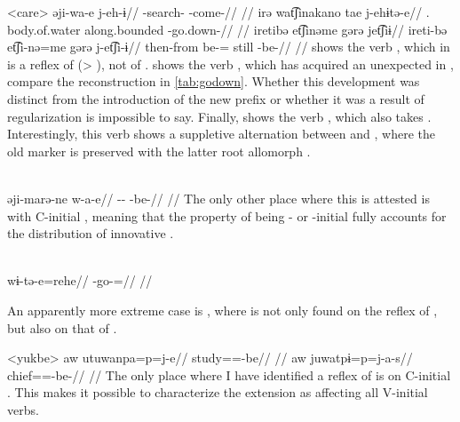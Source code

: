 \pex<care>\carijo
{}
\begingl
\gla əji-wa-e j-eh-ɨ//
\glb {}-search- -come-//
\glft {} \parencite[][102]{guerrero2019carijo}//
\endgl
{}
\begingl
\gla irə wat͡ʃinakano tae j-ehɨtə-e//
\glb {}. body.of.water along.bounded -go.down-//
\glft {} //
\endgl
{}
\begingl
\glpreamble iretibə et͡ʃinəme gərə jet͡ʃiɨ//
\gla ireti-bə et͡ʃi-nə=me gərə j-et͡ʃi-ɨ//
\glb then-from be-= still -be-//
\glft {} \parencite[][177]{robayo1989rame}//
\endgl
\xe
%
 shows the verb , which in \carijo is a reflex of  (> ), not of .
 shows the verb , which has acquired an unexpected  in \carijo, compare the reconstruction in \cref{tab:godown}.
Whether this development was distinct from the introduction of the new prefix  or whether it was a result of regularization is impossible to say.
Finally,  shows the verb  , which also takes .
Interestingly, this verb shows a suppletive alternation between  and , where the old marker  is preserved with the latter root allomorph .

\carijo \parencite[][42]{guerrero2016karihona}\\
\begingl
\gla əji-marə-ne w-a-e//
\glb {}-- -be-//
\glft {}//
\endgl
\xe
%
The only other place where this  is attested is with C-initial   , meaning that the property of being - or -initial fully accounts for the distribution of innovative .

\carijo \parencite[][5]{guerrero2016karihona}\\
\begingl
\gla wɨ-tə-e=rehe//
\glb {}-go-=//
\glft {}//
\endgl
\xe

An apparently more extreme case is \yukpa, where  is not only found on the reflex of  , but also on that of  .

\pex<yukbe>\yukpa \parencite[][142, 143]{meira2006syntactic}
\begingl
\gla aw utuwanpa=p=j-e//
\glb {} study==-be//
\glft {}//
\endgl
{}
\begingl
\gla aw juwatpɨ=p=j-a-s//
\glb {} chief==-be-//
\glft {}//
\endgl
\xe
%
The only place where I have identified a reflex of  is on C-initial  .
This makes it possible to characterize the extension as affecting all V-initial verbs.

